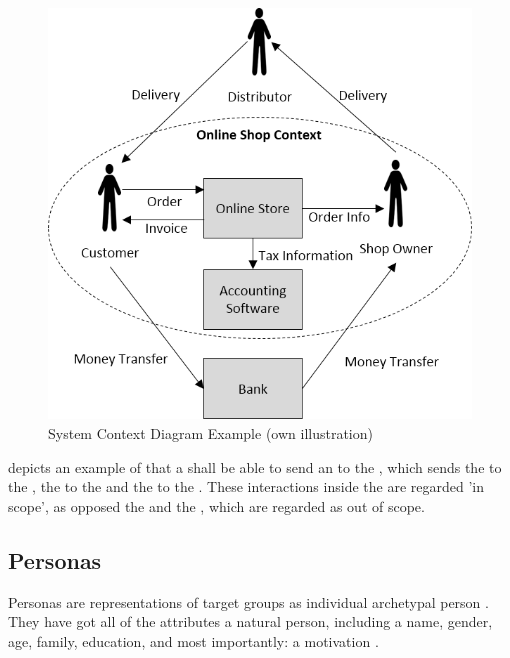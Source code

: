 \begin{figure}[H]
    \centering
    \includegraphics[height=.5\textheight]{img/SystemContextExample.png}
    \caption[System Context Diagram Example]{System Context Diagram Example (own illustration)}
    \label{fig:scEx}
\end{figure}

 depicts an example of that a  shall be able to send an  to the , which sends the  to the , the  to the  and the  to the . These interactions inside the  are regarded 'in scope', as opposed the  and the , which are regarded as out of scope.

\subsection{Personas \label{ssec:personas}}

Personas are representations of target groups as individual archetypal person \parencite[cf.][81]{Cooper.2007}. They have got all of the attributes a natural person, including a name, gender, age, family, education, and most importantly: a motivation \parencites[cf.][]{Platt.2016}[cf.][83-84]{Cooper.2007}. 

